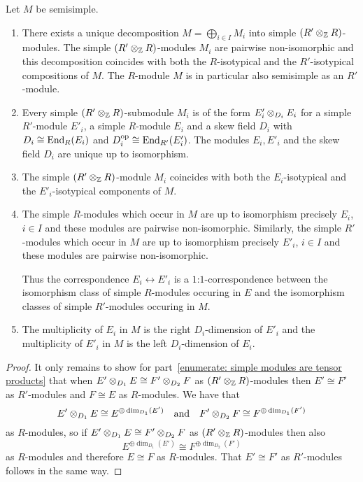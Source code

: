 \begin{theorem}
  \label{theorem: canonical decomposition of ss module}
  Let $M$ be semisimple.
  \begin{enumerate}
    \item
      There exists a unique decomposition $M  = \bigoplus_{i \in I} M_i$ into simple $(R' \mathbin{\otimes}_{\mathbb{Z}} R)$-modules.
      The simple $(R' \mathbin{\otimes}_{\mathbb{Z}} R)$-modules $M_i$ are pairwise non-isomorphic and this decomposition coincides with both the $R$-isotypical and the $R'$-isotypical compositions of $M$.
      The $R$-module $M$ is in particular also semisimple as an $R'$-module.
    \item
      \label{enumerate: simple modules are tensor products}
      Every simple $(R' \mathbin{\otimes}_{\mathbb{Z}} R)$-submodule $M_i$ is of the form $E'_i \mathbin{\otimes}_{D_i} E_i$ for a simple $R'$-module $E'_i$, a simple $R$-module $E_i$ and a skew field $D_i$ with $D_i \cong \operatorname{End}_R(E_i)$ and $D_i^{\operatorname{op}} \cong \operatorname{End}_{R'}(E'_i)$.
      The modules $E_i, E'_i$ and the skew field $D_i$ are unique up to isomorphism.
    \item
      The simple $(R' \mathbin{\otimes}_{\mathbb{Z}} R)$-module $M_i$ coincides with both the $E_i$-isotypical and the $E'_i$-isotypical components of $M$.
    \item
      The simple $R$-modules which occur in $M$ are up to isomorphism precisely $E_i$, $i \in I$ and these modules are pairwise non-isomorphic.
      Similarly, the simple $R'$-modules which occur in $M$ are up to isomorphism precisely $E'_i$, $i \in I$ and these modules are pairwise non-isomorphic.
      
      Thus the correspondence $E_i \leftrightarrow E'_i$ is a $1$:$1$-correspondence between the isomorphism class of simple $R$-modules occuring in $E$ and the isomorphism classes of simple $R'$-modules occuring in $M$.
    \item
      The multiplicity of $E_i$ in $M$ is the right $D_i$-dimension of $E'_i$ and the multiplicity of $E'_i$ in $M$ is the left $D_i$-dimension of $E_i$.
  \end{enumerate}
\end{theorem}


\begin{proof}
  It only remains to show for part~\ref*{enumerate: simple modules are tensor products} that when $E' \mathbin{\otimes}_{D_1} E \cong F' \mathbin{\otimes}_{D_2} F$ as $(R' \mathbin{\otimes}_{\mathbb{Z}} R)$-modules then $E' \cong F'$ as $R'$-modules and $F \cong E$ as $R$-modules.
  We have that
  \[
          E' \mathbin{\otimes}_{D_1} E
    \cong E^{\oplus \dim_{D_1}(E')}
    \quad\text{and}\quad
          F' \mathbin{\otimes}_{D_2} F
    \cong F^{\oplus \dim_{D_1}(F')}
  \]
  as $R$-modules, so if $E' \mathbin{\otimes}_{D_1} E \cong F' \mathbin{\otimes}_{D_2} F$ as $(R' \mathbin{\otimes}_{\mathbb{Z}} R)$-modules then also
  \[
          E^{\oplus \dim_{D_1}(E')}
    \cong F^{\oplus \dim_{D_2}(F')}
  \]
  as $R$-modules and therefore $E \cong F$ as $R$-modules.
  That $E' \cong F'$ as $R'$-modules follows in the same way.
\end{proof}


